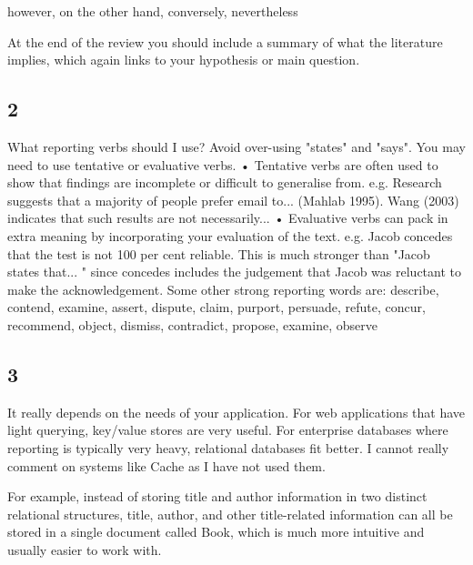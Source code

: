 \documentclass[12pt,letter]{article}
\begin{document}
however, on the other hand, conversely, nevertheless

At the end of the review you should include a summary of what the literature implies, which again links to your hypothesis or main question.

\subsection*{2}
What reporting verbs should I use?
Avoid over-using "states" and "says". You may need to use tentative or evaluative verbs.
• Tentative verbs are often used to show that findings are incomplete or difficult to generalise from.
e.g. Research suggests that a majority of people prefer email to... (Mahlab 1995). Wang (2003) indicates that such results are not necessarily...
• Evaluative verbs can pack in extra meaning by incorporating your evaluation of the text. e.g. Jacob concedes that the test is not 100 per cent reliable.
This is much stronger than "Jacob states that... " since concedes includes the judgement that Jacob was reluctant to make the acknowledgement.
Some other strong reporting words are:
describe, contend, examine, assert, dispute, claim, purport, persuade, refute, concur, recommend, object, dismiss, contradict, propose, examine, observe

\subsection*{3}
It really depends on the needs of your application. For web applications that have light querying, key/value stores are very useful. For enterprise databases where reporting is typically very heavy, relational databases fit better. I cannot really comment on systems like Cache as I have not used them.


For example, instead of storing title and author information in two distinct relational structures, title, author, and other title-related information can all be stored in a single document called Book, which is much more intuitive and usually easier to work with.

\end{document}
